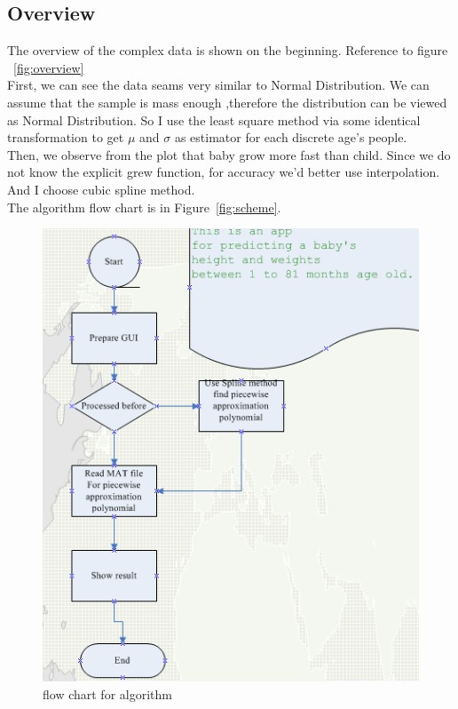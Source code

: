 \documentclass[
10pt, %
a4paper, %
oneside, %
headinclude,footinclude, %
BCOR5mm, %
]{scrartcl}
\begin{document}
\subsection{Overview}
The overview of the complex data is shown on the beginning. Reference to figure  ~\vref{fig:overview}
\\First, we can see the data seams very similar to Normal Distribution. We can assume that the sample is mass enough ,therefore the distribution can be viewed as Normal Distribution. So I use the  least square method via some identical transformation to get $\mu$ and $\sigma$ as estimator  for each discrete age's people.
\\Then, we observe from the plot that baby grow more fast than child. Since we do not know the explicit grew function, for accuracy we'd better use interpolation. And I choose cubic spline method.
\\The algorithm flow chart is in  Figure~\vref{fig:scheme}.


\begin{figure}[tb]
\centering
\includegraphics[width=0.5\columnwidth]{./fig/scheme.png}
\caption[flow chart for my algorithm]{flow chart for algorithm} %
\label{fig:scheme}
\end{figure}
\end{document}
